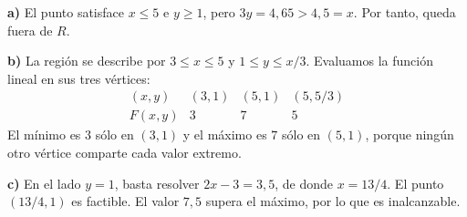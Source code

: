 \textbf{a)} El punto satisface $x\le5$ e $y\ge1$, pero $3y=4{,}65>4{,}5=x$. Por tanto, queda fuera de $R$.

\textbf{b)} La región se describe por $3\le x\le5$ y $1\le y\le x/3$. Evaluamos la función lineal en sus tres vértices:
\[
\begin{array}{c|rrr}
(x,y)&(3,1)&(5,1)&(5,5/3)\\\hline
F(x,y)&3&7&5
\end{array}
\]
El mínimo es $\boxed{3}$ sólo en $(3,1)$ y el máximo es $\boxed{7}$ sólo en $(5,1)$, porque ningún otro vértice comparte cada valor extremo.

\textbf{c)} En el lado $y=1$, basta resolver $2x-3=3{,}5$, de donde $x=13/4$. El punto $(13/4,1)$ es factible. El valor $7{,}5$ supera el máximo, por lo que es inalcanzable.

